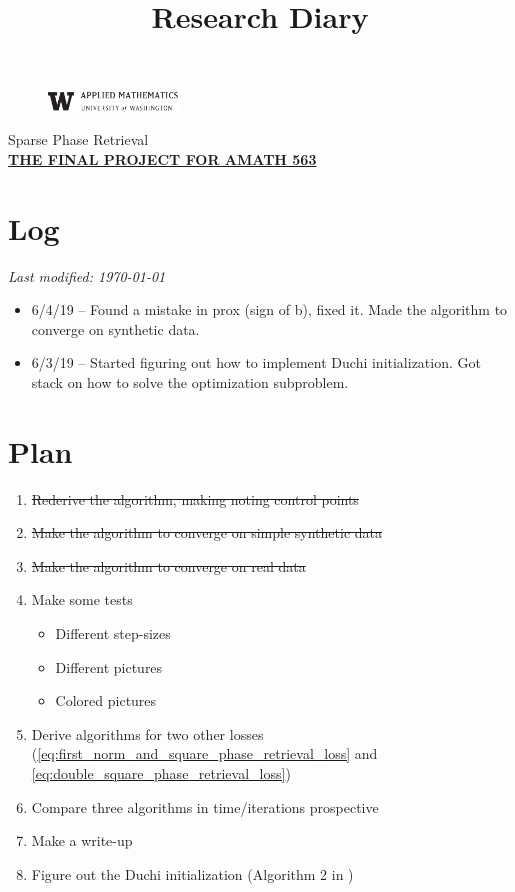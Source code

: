 \documentclass[11pt,letterpaper]{article}
\newcommand{\projectNameShort}{Sparse Phase Retrieval}
\newcommand{\projectNameLong}{The Final Project for AMATH 563}
\newcommand{\univlogo}{%
  \noindent %
  \begin{figure}
    \vspace{-24pt}
    \begin{center}
      \includegraphics[width=0.31\textwidth]{Images/univ-logo.jpg}
    \end{center}
    \vspace{-10pt}
  \end{figure}
}
\numberwithin{equation}{section} %
\numberwithin{figure}{section} %
\numberwithin{table}{section} %
\begin{document}
\title{Research Diary}
\univlogo
{\Huge \projectNameShort}\\[2mm]

{\large \underline{\textbf{\uppercase{\projectNameLong}}}}\\

\section*{Log}
\textit{Last modified: \today}
\begin{itemize}
    \item{6/4/19} -- Found a mistake in prox (sign of b), fixed it. Made the algorithm to converge on synthetic data.
    \item 6/3/19 -- Started figuring out how to implement Duchi initialization. Got stack on how to solve the optimization subproblem. 
\end{itemize}

\section*{Plan}
\begin{enumerate}
    \item \sout{Rederive the algorithm, making noting control points}
    \item \sout{Make the algorithm to converge on simple synthetic data}
    \item \sout{Make the algorithm to converge on real data}
    \item Make some tests
    \begin{itemize}
        \item Different step-sizes
        \item Different pictures
        \item Colored pictures
    \end{itemize}
    \item Derive algorithms for two other losses (\ref{eq:first_norm_and_square_phase_retrieval_loss} and \ref{eq:double_square_phase_retrieval_loss})
    \item Compare three algorithms in time/iterations prospective
    \item Make a write-up
    \item Figure out the Duchi initialization (Algorithm 2 in \cite{Duchi2017PhaseRetrival})
\end{enumerate}

\listoftodos
\end{document}
